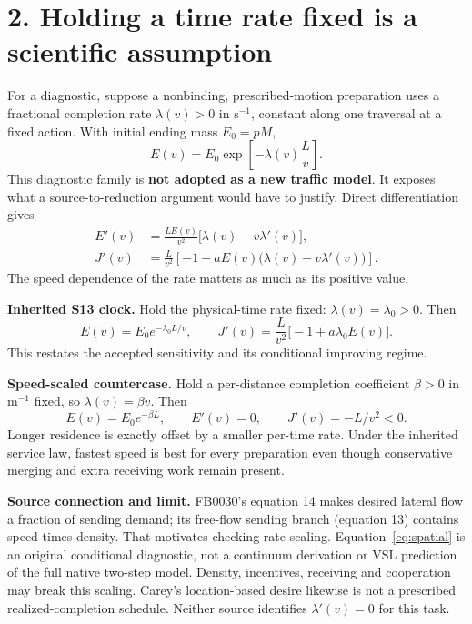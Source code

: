 \documentclass[11pt]{article}
\begin{document}
\newpage
\section*{2. Holding a time rate fixed is a scientific assumption}
For a diagnostic, suppose a nonbinding, prescribed-motion preparation uses a
fractional completion rate $\lambda(v)>0$ in $\mathrm{s}^{-1}$, constant along
one traversal at a fixed action. With initial ending mass $E_0=pM$,
\begin{equation}
 E(v)=E_0\exp\!\left[-\lambda(v)\frac{L}{v}\right].
 \label{eq:rate}
\end{equation}
This diagnostic family is \textbf{not adopted as a new traffic model}.
It exposes what a source-to-reduction argument would have to justify. Direct
differentiation gives
\begin{align}
 E'(v)&=\frac{LE(v)}{v^2}
          \bigl[\lambda(v)-v\lambda'(v)\bigr],\label{eq:rategrad}\\
 J'(v)&=\frac{L}{v^2}
       \left[-1+aE(v)\bigl(\lambda(v)-v\lambda'(v)\bigr)\right].
 \label{eq:joinedgrad}
\end{align}
The speed dependence of the rate matters as much as its positive value.

\textbf{Inherited S13 clock.} Hold the physical-time rate fixed:
$\lambda(v)=\lambda_0>0$. Then
\begin{equation}
 E(v)=E_0e^{-\lambda_0L/v},\qquad
 J'(v)=\frac{L}{v^2}\bigl[-1+a\lambda_0E(v)\bigr].
 \label{eq:s13}
\end{equation}
This restates the accepted sensitivity and its conditional improving regime.

\textbf{Speed-scaled countercase.} Hold a per-distance completion coefficient
$\beta>0$ in $\mathrm{m}^{-1}$ fixed, so $\lambda(v)=\beta v$. Then
\begin{equation}
 E(v)=E_0e^{-\beta L},\qquad E'(v)=0,\qquad
 J'(v)=-L/v^2<0.
 \label{eq:spatial}
\end{equation}
Longer residence is exactly offset by a smaller per-time rate. Under the
inherited service law, fastest speed is best for every preparation even though
conservative merging and extra receiving work remain present.

\textbf{Source connection and limit.} FB0030's equation 14 makes desired
lateral flow a fraction of sending demand; its free-flow sending branch
(equation 13) contains speed times density. That motivates checking rate scaling.
Equation~\eqref{eq:spatial} is an original conditional diagnostic, not a
continuum derivation or VSL prediction of the full native two-step model.
Density, incentives, receiving and cooperation may break this scaling.
Carey's location-based desire likewise is not a prescribed realized-completion
schedule. Neither source identifies $\lambda'(v)=0$ for this task.
\end{document}
